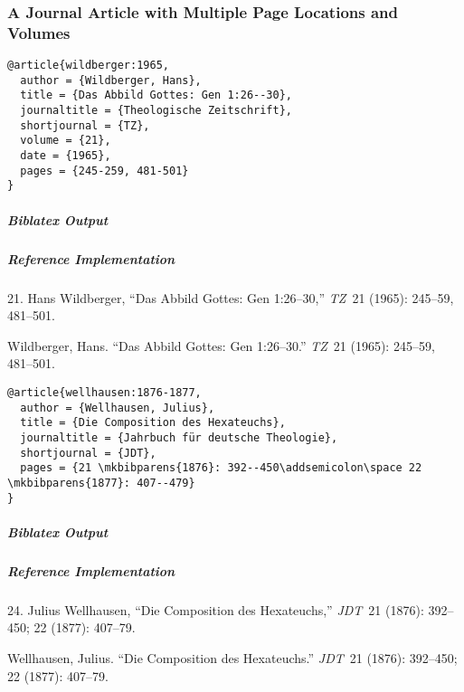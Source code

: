\documentclass[a4paper]{article}
\newenvironment{biboutput}{%
  \subparagraph{Biblatex Output}
}{\color{black}}
\newenvironment{refimp}{%
  \subparagraph{Reference Implementation}
  \color{reference-colour}
  \rm
}{\par\color{black}}
\begin{document}
\subsubsection{A Journal Article with Multiple Page Locations and Volumes}

\begin{lstlisting}
@article{wildberger:1965,
  author = {Wildberger, Hans},
  title = {Das Abbild Gottes: Gen 1:26--30},
  journaltitle = {Theologische Zeitschrift},
  shortjournal = {TZ},
  volume = {21},
  date = {1965},
  pages = {245-259, 481-501}
}
\end{lstlisting}

\begin{biboutput}
\end{biboutput}

\begin{refimp}
  \hspace*{\bibindent}21. Hans Wildberger, “Das Abbild Gottes: Gen 1:26–30,”
  \emph{TZ}~21 (1965): 245–59, 481–501.

  \hangindent\bibindent Wildberger, Hans. “Das Abbild Gottes: Gen 1:26–30.”
  \emph{TZ}~21 (1965): 245–59, 481–501.

\end{refimp}

\begin{lstlisting}
@article{wellhausen:1876-1877,
  author = {Wellhausen, Julius},
  title = {Die Composition des Hexateuchs},
  journaltitle = {Jahrbuch für deutsche Theologie},
  shortjournal = {JDT},
  pages = {21 \mkbibparens{1876}: 392--450\addsemicolon\space 22 \mkbibparens{1877}: 407--479}
}
\end{lstlisting}

\begin{biboutput}
\end{biboutput}

\begin{refimp}
  \hspace*{\bibindent}24. Julius Wellhausen, “Die Composition des Hexateuchs,”
  \emph{JDT}~21 (1876): 392–450; 22 (1877): 407–79.

  \hangindent\bibindent Wellhausen, Julius. “Die Composition des Hexateuchs.”
  \emph{JDT}~21 (1876): 392–450; 22 (1877): 407–79.

\end{refimp}
\end{document}
